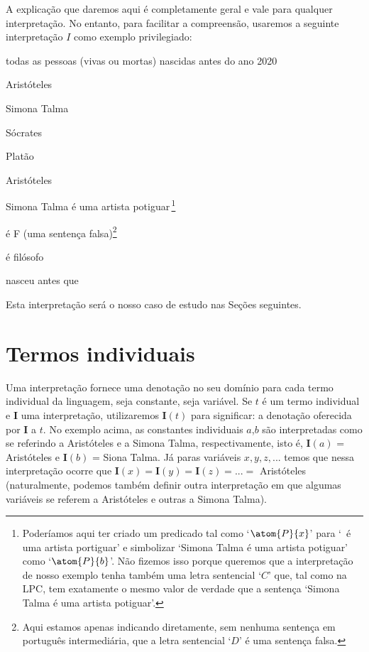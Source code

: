 A explicação que daremos aqui é completamente geral e vale para qualquer interpretação.
No entanto, para facilitar a compreensão, usaremos a seguinte interpretação $I$ como exemplo privilegiado:
\begin{center}\label{i:Sample}
	\begin{ekey}
		\item[\text{domínio}] {\small todas as pessoas (vivas ou mortas) nascidas antes do ano 2020}
		\item[a] {\small Aristóteles}
		\item[b] {\small Simona Talma}
		\item[c] {\small Sócrates}
		\item[d] {\small Platão}
		\item[x,y,z,...] {\small Aristóteles}
		\item[C] {\small Simona Talma é uma artista potiguar\,}\footnote{
			Poderíamos aqui ter criado um predicado tal como `$\atom{P}{x}$' para `~é uma artista portiguar' e simbolizar `Simona Talma é uma artista potiguar' como `$\atom{P}{b}$'.
			Não fizemos isso porque queremos que a interpretação de nosso exemplo tenha também uma letra sentencial `$C$' que, tal  como na LPC, tem exatamente o mesmo valor de verdade que a sentença `Simona Talma é uma artista potiguar'.}
		\item[D] {\small é F (uma sentença falsa)}\footnote{
			Aqui estamos apenas indicando diretamente, sem nenhuma sentença em português intermediária, que a letra sentencial `$D$' é uma sentença falsa.}
		\item[\atom{F}{x}]  {\small é filósofo}
		\item[\atom{R}{x,y}]  {\small nasceu antes que} 
	\end{ekey}
\end{center}
Esta interpretação será o nosso caso de estudo nas Seções seguintes.

\section{Termos individuais}

Uma interpretação fornece uma denotação no seu domínio para cada termo individual da linguagem, seja constante, seja variável.
Se $t$ é um termo individual e $\mathbf{I}$ uma interpretação, utilizaremos $\mathbf{I}(t)$ para significar: a denotação oferecida por $\mathbf{I}$ a $t$.
No exemplo acima, as constantes individuais $a$,$b$ são interpretadas como se referindo a Aristóteles e a Simona Talma, respectivamente, isto é, $\mathbf{I}(a)$ = Aristóteles e $\mathbf{I}(b)$ = Siona Talma.
Já paras variáveis $x,y,z,...$ temos que nessa interpretação ocorre que $\mathbf{I}(x)=\mathbf{I}(y)=\mathbf{I}(z)=...=$ Aristóteles (naturalmente, podemos também definir outra interpretação em que algumas variáveis se referem a Aristóteles e outras a Simona Talma).



